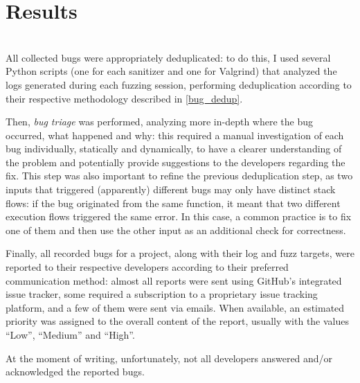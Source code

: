 \chapter{Results} \label{chap_4}
\ \\

All collected bugs were appropriately deduplicated: to do this, I used several Python scripts (one for each sanitizer and one for Valgrind) that analyzed the logs generated during each fuzzing session, performing deduplication according to their respective methodology described in \ref{bug_dedup}.

Then, \textit{bug triage} was performed, analyzing more in-depth where the bug occurred, what happened and why: this required a manual investigation of each bug individually, statically and dynamically, to have a clearer understanding of the problem and potentially provide suggestions to the developers regarding the fix.
This step was also important to refine the previous deduplication step, as two inputs that triggered (apparently) different bugs may only have distinct stack flows: if the bug originated from the same function, it meant that two different execution flows triggered the same error. In this case, a common practice is to fix one of them and then use the other input as an additional check for correctness.

Finally, all recorded bugs for a project, along with their log and fuzz targets, were reported to their respective developers according to their preferred communication method: almost all reports were sent using GitHub's integrated issue tracker, some required a subscription to a proprietary issue tracking platform, and a few of them were sent via emails.
When available, an estimated priority was assigned to the overall content of the report, usually with the values ``Low'', ``Medium'' and ``High''.
\newline

At the moment of writing, unfortunately, not all developers answered and/or acknowledged the reported bugs.



\newpage

